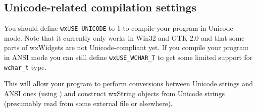 
\subsection{Unicode-related compilation settings}\label{unicodesettings}

You should define {\tt wxUSE\_UNICODE} to $1$ to compile your program in
Unicode mode. Note that it currently only works in Win32 and GTK 2.0 and
that some parts of
wxWidgets are not Unicode-compliant yet. If you
compile your program in ANSI mode you can still define {\tt wxUSE\_WCHAR\_T} 
to get some limited support for {\tt wchar\_t} type.

This will allow your program to perform conversions between Unicode strings and
ANSI ones (using ) 
and construct wxString objects from Unicode strings (presumably read
from some external file or elsewhere).

